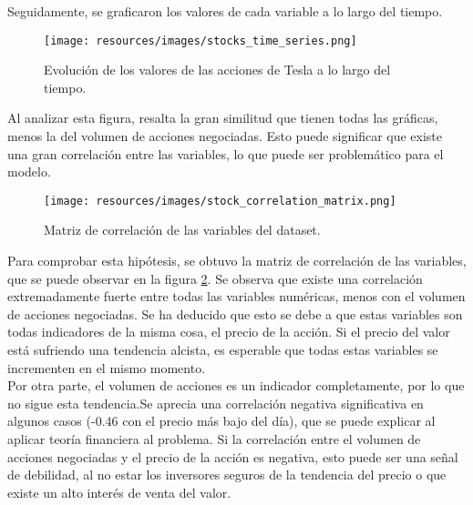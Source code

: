\documentclass[a4paper, 12pt]{report}
\begin{document}
                        Seguidamente, se graficaron los valores de cada variable a lo largo del tiempo.

                        \begin{figure}[H]
                                \centering
                                \texttt{[image: resources/images/stocks\_time\_series.png]}
                                \caption{Evolución de los valores de las acciones de Tesla a lo largo del tiempo.}
                                \label{fig:stocks_time_series}
                        \end{figure}

                        Al analizar esta figura, resalta la gran similitud que tienen todas las gráficas, menos la del volumen de acciones negociadas.
                        Esto puede significar que existe una gran correlación entre las variables, lo que puede ser problemático para el modelo.\\

                        \begin{figure}[H]
                                \centering
                                \texttt{[image: resources/images/stock\_correlation\_matrix.png]}
                                \caption{Matriz de correlación de las variables del dataset.}
                                \label{fig:stocks_corr}
                        \end{figure}

                        Para comprobar esta hipótesis, se obtuvo la matriz de correlación de las variables, que se puede observar en la figura \ref{fig:stocks_corr}.
                        Se observa que existe una correlación extremadamente fuerte entre todas las variables numéricas, menos con el volumen de acciones negociadas.
                        Se ha deducido que esto se debe a que estas variables son todas indicadores de la misma cosa, el precio de la acción. Si el precio del valor
                        está sufriendo una tendencia alcista, es esperable que todas estas variables se incrementen en el mismo momento.\\
                        
                        Por otra parte, el volumen de acciones es un indicador completamente, por lo que no sigue esta tendencia.Se aprecia una correlación negativa significativa en algunos casos
                        (-0.46 con el precio más bajo del día), que se puede explicar al aplicar teoría financiera al problema. Si la correlación entre el volumen de acciones negociadas y el precio de la acción es negativa, 
                        esto puede ser una señal de debilidad, al no estar los inversores seguros de la tendencia del precio o que existe un alto interés de venta del valor.\\
                        
\end{document}
